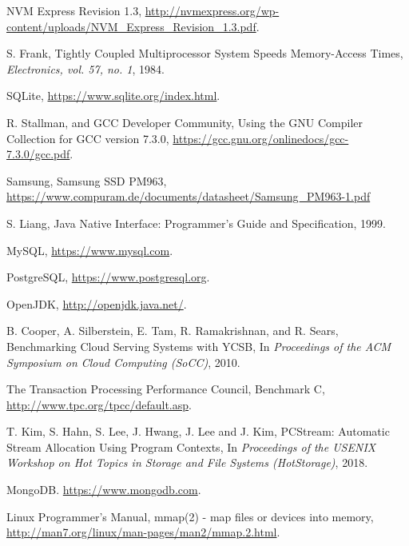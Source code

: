 \begin{thebibliography}{00}
NVM Express Revision 1.3,
\url{http://nvmexpress.org/wp-content/uploads/NVM_Express_Revision_1.3.pdf}.

S. Frank,
Tightly Coupled Multiprocessor System Speeds Memory-Access Times,
\textit{Electronics, vol. 57, no. 1}, 1984.

SQLite,
\url{https://www.sqlite.org/index.html}.


R. Stallman, and GCC Developer Community,
Using the GNU Compiler Collection for GCC version 7.3.0,
\url{https://gcc.gnu.org/onlinedocs/gcc-7.3.0/gcc.pdf}.

Samsung, Samsung SSD PM963, 
\url{https://www.compuram.de/documents/datasheet/Samsung_PM963-1.pdf}

S. Liang,
Java Native Interface: Programmer's Guide and Specification,
1999.

MySQL,
\url{https://www.mysql.com}.

PostgreSQL,
\url{https://www.postgresql.org}.

OpenJDK,
\url{http://openjdk.java.net/}.

B. Cooper, A. Silberstein, E. Tam, R. Ramakrishnan, and R. Sears,
Benchmarking Cloud Serving Systems with YCSB,
In \textit{Proceedings of the ACM Symposium on Cloud Computing (SoCC)}, 2010.

The Transaction Processing Performance Council,
Benchmark C,
\url{http://www.tpc.org/tpcc/default.asp}. 

T. Kim, S. Hahn, S. Lee, J. Hwang, J. Lee and J. Kim,
PCStream: Automatic Stream Allocation Using Program Contexts,
In \textit{Proceedings of the USENIX Workshop on Hot Topics in Storage
and File Systems (HotStorage)}, 2018.

MongoDB.
\url{https://www.mongodb.com}.

Linux Programmer's Manual,
mmap(2) - map files or devices into memory,
\url{http://man7.org/linux/man-pages/man2/mmap.2.html}.

\end{thebibliography}
